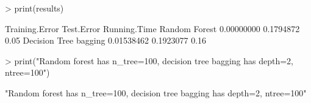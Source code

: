 \documentclass{article}
\begin{document}
\begin{Schunk}
\begin{Sinput}
> print(results)
\end{Sinput}
\begin{Soutput}
                      Training.Error Test.Error Running.Time
Random Forest             0.00000000  0.1794872         0.05
Decision Tree bagging     0.01538462  0.1923077         0.16
\end{Soutput}
\begin{Sinput}
> print("Random forest has n_tree=100, decision tree bagging has depth=2, ntree=100")
\end{Sinput}
\begin{Soutput}
[1] "Random forest has n_tree=100, decision tree bagging has depth=2, ntree=100"
\end{Soutput}
\end{Schunk}
\end{document}

